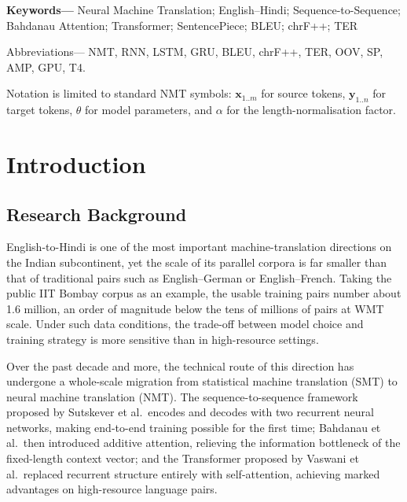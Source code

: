\documentclass[a4paper,12pt]{vpcoe}
\begin{document}
\makecontents

\keywords
{\large\bf{Keywords---}}
Neural Machine Translation; English--Hindi; Sequence-to-Sequence; Bahdanau Attention; Transformer; SentencePiece; BLEU; chrF++; TER

\vspace{10MM}
\noindent
\large{Abbreviations---} NMT, RNN, LSTM, GRU, BLEU, chrF++, TER, OOV, SP, AMP, GPU, T4.

\notations
\large{Notation is limited to standard NMT symbols: $\mathbf{x}_{1..m}$ for source tokens, $\mathbf{y}_{1..n}$ for target tokens, $\theta$ for model parameters, and $\alpha$ for the length-normalisation factor.}

\renewcommand{\footrulewidth}{1pt}

\chapter{Introduction}

\section{Research Background}
English-to-Hindi is one of the most important machine-translation directions on the Indian subcontinent, yet the scale of its parallel corpora is far smaller than that of traditional pairs such as English--German or English--French. Taking the public IIT Bombay corpus as an example, the usable training pairs number about 1.6 million, an order of magnitude below the tens of millions of pairs at WMT scale. Under such data conditions, the trade-off between model choice and training strategy is more sensitive than in high-resource settings.

Over the past decade and more, the technical route of this direction has undergone a whole-scale migration from statistical machine translation (SMT) to neural machine translation (NMT). The sequence-to-sequence framework proposed by Sutskever et al.\ encodes and decodes with two recurrent neural networks, making end-to-end training possible for the first time; Bahdanau et al.\ then introduced additive attention, relieving the information bottleneck of the fixed-length context vector; and the Transformer proposed by Vaswani et al.\ replaced recurrent structure entirely with self-attention, achieving marked advantages on high-resource language pairs.
\end{document}
